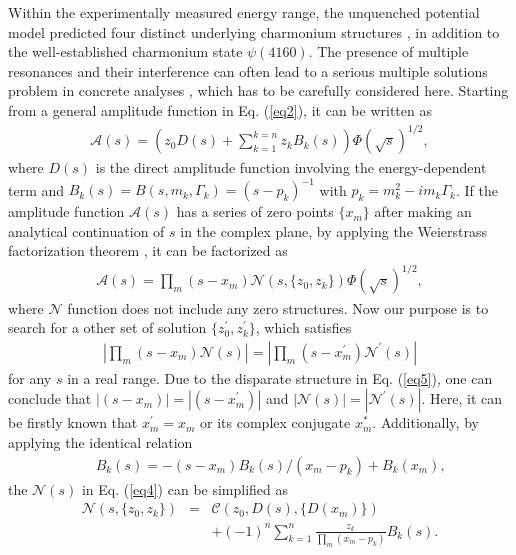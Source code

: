 \documentclass[final,5p,times,twocolumn]{elsarticle}
\begin{document}
{ Within the experimentally measured energy range, the unquenched potential model predicted four distinct underlying charmonium structures \cite{Wang:2019mhs}, in addition to the well-established charmonium state $\psi(4160)$. } The presence of multiple resonances and their interference can often lead to a serious multiple solutions problem in concrete analyses \cite{Yuan:2009gd,Zhu:2011ha,Bai:2019jrb}, which has to be carefully considered here. Starting from a general amplitude function in Eq. (\ref{eq2}), it can be written as
\begin{eqnarray}
\mathcal{A}(s)=\left(z_0D(s)+\sum_{k=1}^{k=n}z_kB_k(s)\right)\Phi(\sqrt{s})^{1/2},
\end{eqnarray}
where $D(s)$ is the direct amplitude function involving the energy-dependent term and $B_k(s)=B(s,m_k,\Gamma_k)=(s-p_k)^{-1}$ with $p_k=m_k^2-im_k\Gamma_k$. If the amplitude function $\mathcal{A}(s)$ has a series of zero points $\{x_m\}$ after making an analytical continuation of $s$ in the complex plane, by applying the Weierstrass factorization theorem \cite{Knopp}, it can be factorized as
\begin{eqnarray}
\mathcal{A}(s)=\prod_m(s-x_m)\mathcal{N}\left(s,\{z_0,z_k\}\right)\Phi(\sqrt{s})^{1/2}, \label{eq4}
\end{eqnarray}
where $\mathcal{N}$ function does not include any zero structures. Now our purpose is to search for a other set of solution $\{z_0^{\prime},z_k^{\prime}\}$, which satisfies 
\begin{eqnarray}
   \left|\prod_m(s-x_m)\mathcal{N}(s)\right|=\left|\prod_m(s-x_m^{\prime})\mathcal{N}^{\prime}(s)\right| \label{eq5}
\end{eqnarray}
for any $s$ in a real range. Due to the disparate structure in Eq. (\ref{eq5}), one can conclude that  $ |(s-x_m)|=|(s-x_m^{\prime})|$ and $|\mathcal{N}(s)|=|\mathcal{N}^{\prime}(s)|$. Here, it can be firstly known that $x_m^{\prime}=x_m$ or its complex conjugate $x_m^{*}$.
Additionally, by applying the identical relation 
\begin{eqnarray}
   && B_k(s)=-(s-x_m)B_k(s)/(x_m-p_k)+B_k(x_m), 
\end{eqnarray}
the $\mathcal{N}(s)$ in Eq. (\ref{eq4}) can be simplified as
\begin{eqnarray}
\mathcal{N}(s,\{z_0,z_k\})&=&\mathcal{C}(z_0,D(s),\{D(x_m)\}) \nonumber \\
&&+(-1)^{n}\sum_{k=1}^{n}\frac{z_k}{\prod_m(x_m-p_k)}B_k(s).
\end{eqnarray}
\end{document}
